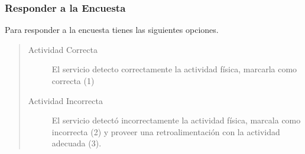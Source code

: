 {\begin{quote}
\begin{description}
\end{description}
\end{quote}

\subsubsection{Responder a la Encuesta}
\label{contrib:responder-a-la-encuesta}
Para responder a la encuesta tienes las siguientes opciones.
\begin{quote}
\begin{description}
\item[{Actividad Correcta}] \leavevmode
El servicio detecto correctamente la actividad física, marcarla como correcta (1)

\item[{Actividad Incorrecta}] \leavevmode
El servicio detectó incorrectamente la actividad física, marcala como incorrecta (2)
y proveer una retroalimentación con la actividad adecuada (3).

\end{description}
\end{quote}

}
